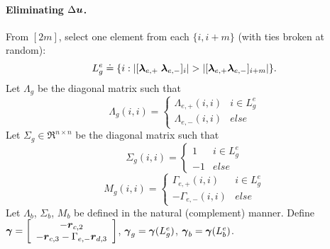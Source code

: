 \paragraph{Eliminating $\Delta \boldsymbol{u}$.}

From $[2m]$, select one element from each $\{ i, i+m\}$ (with ties broken at random):
$$L^e_g \doteq \{ i : | [\boldsymbol{\lambda}_{e,+} \; \boldsymbol{\lambda}_{e,-}]_i | > | [\boldsymbol{\lambda}_{e,+} \\ \boldsymbol{\lambda}_{e,-} ]_{i+m} | \}.$$
Let $\Lambda_g$ be the diagonal matrix such that
$$\Lambda_g(i,i) = \left\{ \begin{array}{cc} \Lambda_{e,+}(i,i) & i \in L^e_g \\ \Lambda_{e,-}(i,i) & else \end{array}\right.$$ 
Let $\Sigma_g \in \Re^{n \times n}$ be the diagonal matrix such that 
$$\Sigma_g(i,i) = \left\{ \begin{array}{cc} 1 & i \in L^e_g \\ -1 & else \end{array}\right.$$
$$M_g(i,i) = \left\{ \begin{array}{cc} \Gamma_{e,+}(i,i) & i \in L^e_g \\ -\Gamma_{e,-}(i,i) & else \end{array}\right.$$ 
Let $\Lambda_b$, $\Sigma_b$, $M_b$ be defined in the natural (complement) manner. Define $\boldsymbol{\gamma} =  \left[ \begin{array}{c} - \boldsymbol{r}_{c,2} \\ -\boldsymbol{r}_{c,3} - \Gamma_{e,-} \boldsymbol{r}_{d,3} \end{array} \right]$, $\boldsymbol{\gamma}_g = \boldsymbol{\gamma}(L^e_g)$, $\boldsymbol{\gamma}_b = \boldsymbol{\gamma}(L^e_b)$.

